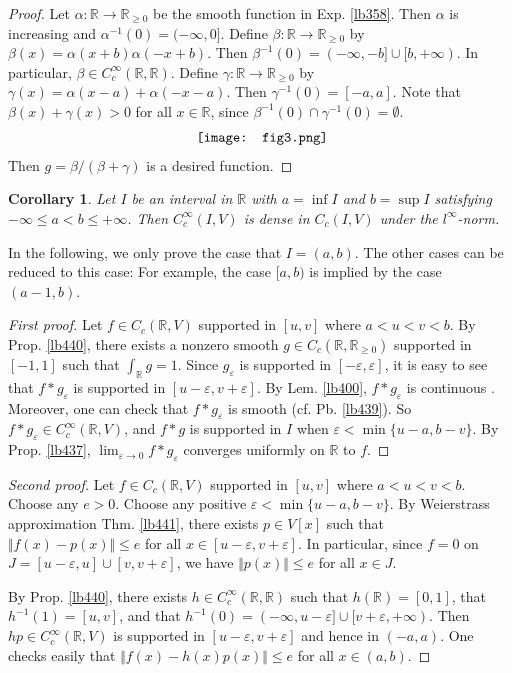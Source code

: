 \documentclass[12pt,b5paper,notitlepage]{article}
\theoremstyle{definition}
\theoremstyle{plain}
\newtheorem{co}[df]{Corollary}
\newcommand{\Rbb}{\mathbb R}
\newcommand{\eps}{\varepsilon}
\numberwithin{equation}{section}
\begin{document}
\begin{proof}
Let $\alpha:\Rbb\rightarrow\Rbb_{\geq0}$ be the smooth function in Exp. \ref{lb358}. Then $\alpha$ is increasing and $\alpha^{-1}(0)=(-\infty,0]$.  Define $\beta:\Rbb\rightarrow\Rbb_{\geq0}$ by $\beta(x)=\alpha(x+b)\alpha(-x+b)$. Then $\beta^{-1}(0)=(-\infty,-b]\cup[b,+\infty)$. In particular, $\beta\in C_c^\infty(\Rbb,\Rbb)$. Define $\gamma:\Rbb\rightarrow\Rbb_{\geq0}$ by $\gamma(x)=\alpha(x-a)+\alpha(-x-a)$. Then $\gamma^{-1}(0)=[-a,a]$. Note that $\beta(x)+\gamma(x)>0$ for all $x\in\Rbb$, since $\beta^{-1}(0)\cap\gamma^{-1}(0)=\emptyset$. 
\begin{align*}
\vcenter{\hbox{{
			\texttt{[image: fig3.png]}}}}
\end{align*}
Then $g=\beta/(\beta+\gamma)$ is a desired function.
\end{proof}


\begin{co}\label{lb446}
Let $I$ be an interval in $\Rbb$ with $a=\inf I$ and $b=\sup I$ satisfying $-\infty\leq a<b\leq+\infty$. Then $C_c^\infty(I,V)$ is dense in $C_c(I,V)$ under the $l^\infty$-norm.
\end{co}

In the following, we only prove the case that $I=(a,b)$. The other cases can be reduced to this case: For example, the case $[a,b)$ is implied by the case $(a-1,b)$.

\begin{proof}[First proof]
Let $f\in C_c(\Rbb,V)$ supported in $[u,v]$ where $a<u<v<b$. By Prop. \ref{lb440}, there exists a nonzero smooth $g\in C_c(\Rbb,\Rbb_{\geq0})$ supported in $[-1,1]$ such that $\int_\Rbb g=1$. Since $g_\eps$ is supported in $[-\eps,\eps]$, it is easy to see that $f*g_\eps$ is supported in $[u-\eps,v+\eps]$. By Lem. \ref{lb400}, $f*g_\eps$ is continuous . Moreover, one can check that $f*g_\eps$ is smooth (cf. Pb. \ref{lb439}). So $f*g_\eps\in C_c^\infty(\Rbb,V)$, and $f*g$ is supported in $I$ when $\eps<\min\{u-a,b-v\}$. By Prop. \ref{lb437}, $\lim_{\eps\rightarrow 0}f*g_\eps$ converges uniformly on $\Rbb$ to $f$.
\end{proof}



\begin{proof}[Second proof]
Let $f\in C_c(\Rbb,V)$ supported in $[u,v]$ where $a<u<v<b$. Choose any $e>0$. Choose any positive $\eps<\min\{u-a,b-v\}$. By Weierstrass approximation Thm. \ref{lb441}, there exists $p\in V[x]$ such that $\Vert f(x)- p(x)\Vert\leq e$ for all $x\in[u-\eps,v+\eps]$. In particular, since $f=0$ on $J=[u-\eps,u]\cup[v,v+\eps]$, we have $\Vert p(x)\Vert\leq e$ for all $x\in J$. 

By Prop. \ref{lb440}, there exists $h\in C_c^\infty(\Rbb,\Rbb)$ such that $h(\Rbb)=[0,1]$, that $h^{-1}(1)=[u,v]$, and that $h^{-1}(0)=(-\infty,u-\eps]\cup[v+\eps,+\infty)$. Then $hp\in C_c^\infty(\Rbb,V)$ is supported in $[u-\eps,v+\eps]$ and hence in $(-a,a)$. One checks easily that $\Vert f(x)-h(x)p(x)\Vert\leq e$ for all $x\in(a,b)$.
\end{proof}
\end{document}
